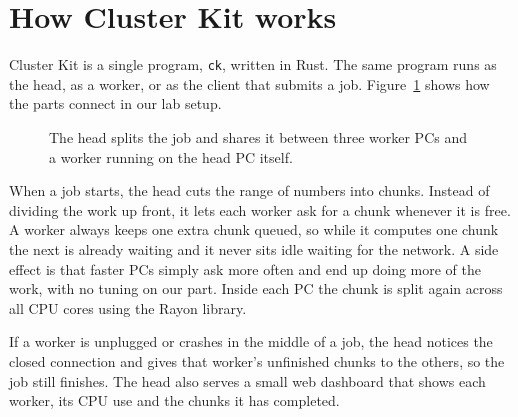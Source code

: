 \documentclass[11pt,a4paper]{article}
\let\oldsection\section
\renewcommand{\section}{\Needspace{6\baselineskip}\oldsection}
\begin{document}
\section{How Cluster Kit works}
Cluster Kit is a single program, \texttt{ck}, written in Rust. The same program runs as the head, as a worker, or as the client that submits a job. Figure~\ref{fig:arch} shows how the parts connect in our lab setup.

\begin{figure}[H]\centering
{}
\caption{The head splits the job and shares it between three worker PCs and a worker running on the head PC itself.}
\label{fig:arch}
\end{figure}

When a job starts, the head cuts the range of numbers into chunks. Instead of dividing the work up front, it lets each worker ask for a chunk whenever it is free. A worker always keeps one extra chunk queued, so while it computes one chunk the next is already waiting and it never sits idle waiting for the network. A side effect is that faster PCs simply ask more often and end up doing more of the work, with no tuning on our part. Inside each PC the chunk is split again across all CPU cores using the Rayon library.

If a worker is unplugged or crashes in the middle of a job, the head notices the closed connection and gives that worker's unfinished chunks to the others, so the job still finishes. The head also serves a small web dashboard that shows each worker, its CPU use and the chunks it has completed.
\end{document}
